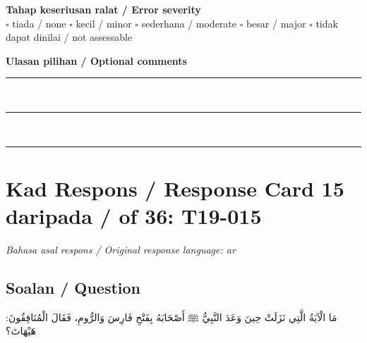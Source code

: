 \documentclass[11pt,a4paper]{article}
\newcommand{\ar}[1]{{\arabicfont #1}}
\begin{document}
\medskip
\textbf{Tahap keseriusan ralat / Error severity}\\
$\square$ tiada / none \quad $\square$ kecil / minor \quad $\square$ sederhana / moderate \quad
$\square$ besar / major \quad $\square$ tidak dapat dinilai / not assessable

\medskip
\textbf{Ulasan pilihan / Optional comments}\\[3pt]
\rule{\textwidth}{0.4pt}\\[16pt]
\rule{\textwidth}{0.4pt}\\[16pt]
\rule{\textwidth}{0.4pt}

\newpage
\section*{Kad Respons / Response Card 15 daripada / of 36: T19-015}
\textit{Bahasa asal respons / Original response language: ar}

\subsection*{Soalan / Question}
\ar{مَا} \ar{الْآيَةُ} \ar{الَّتِي} \ar{نَزَلَتْ} \ar{حِينَ} \ar{وَعَدَ} \ar{النَّبِيُّ} \ar{ﷺ} \ar{أَصْحَابَهُ} \ar{بِفَتْحِ} \ar{فَارِسَ} \ar{وَالرُّومِ،} \ar{فَقَالَ} \ar{الْمُنَافِقُونَ}: \ar{هَيْهَاتَ؟}
\end{document}
